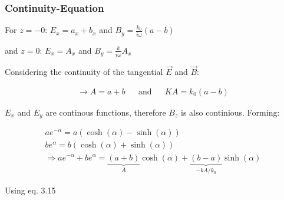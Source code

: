 \newcommand{\Magn}{\vec{B}}
\newcommand{\Elct}{\vec{E}}
\newcommand{\jCurr}{\vec{j}}
\newcommand{\posr}{\vec{r}}
\newcommand{\posx}{\vec{x}}
\newcommand{\wavnum}{\vec{k}}

\newcommand{\Field}{\vec{\mathcal{F}}}
\newcommand{\unitV}[1]{\vec{e}\rmsc{#1}}

\newcommand{\Ohmm}{\physu{\Omega m}}



%
%
%
%
%
%


\subsubsection*{Continuity-Equation}
For $z=-0$: $E_x=a_x+b_x$ and $B_y=\frac{k_0}{i\omega}(a-b)$

and $z=0$: $E_x=A_x$ and $B_y=\frac{k}{i\omega}A_x$

Considering the continuity of the tangential $\vec{E}$ and $\vec{B}$:

\begin{align*}
\rightarrow A=a+b &&\textrm{and}&& KA=k_0(a-b)
\end{align*}

$E_x$ and $E_y$ are continous functions, therefore $B_z$ is also continious. Forming:

\begin{align*}
ae^{-\alpha}=a(\cosh(\alpha)-\sinh(\alpha))\\
be^{\alpha}=b(\cosh(\alpha)+\sinh(\alpha))\\
\Rightarrow ae^{-\alpha}+be^{\alpha}=\underbrace{(a+b)}_{A}\cosh(\alpha)+\underbrace{(b-a)}_{-kA/k_0}\sinh(\alpha)
\end{align*}

Using eq. 3.15

